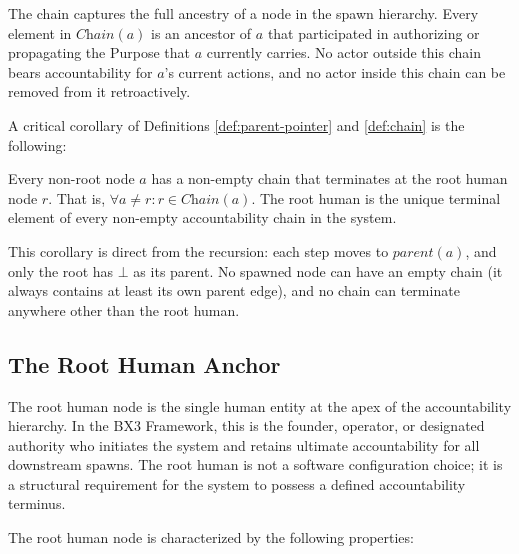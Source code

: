 The chain captures the full ancestry of a node in the spawn hierarchy. Every element in $\textit{Chain}(a)$ is an ancestor of $a$ that participated in authorizing or propagating the Purpose that $a$ currently carries. No actor outside this chain bears accountability for $a$'s current actions, and no actor inside this chain can be removed from it retroactively.

A critical corollary of Definitions \ref{def:parent-pointer} and \ref{def:chain} is the following:

\begin{corrollary}
Every non-root node $a$ has a non-empty chain that terminates at the root human node $r$. That is, $\forall a \neq r: r \in \textit{Chain}(a)$. The root human is the unique terminal element of every non-empty accountability chain in the system.
\end{corrollary}

This corollary is direct from the recursion: each step moves to $\textit{parent}(a)$, and only the root has $\bot$ as its parent. No spawned node can have an empty chain (it always contains at least its own parent edge), and no chain can terminate anywhere other than the root human.

\subsection{The Root Human Anchor}
\label{sec:root-human}

The root human node is the single human entity at the apex of the accountability hierarchy. In the BX3 Framework, this is the founder, operator, or designated authority who initiates the system and retains ultimate accountability for all downstream spawns. The root human is not a software configuration choice; it is a structural requirement for the system to possess a defined accountability terminus.

The root human node is characterized by the following properties:

